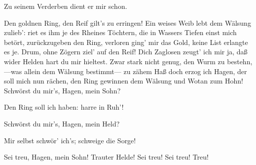 \begin{drama}
\Hagenspeaks



Zu seinem Verderben dient er mir schon.
 

\Alberichspeaks

Den goldnen Ring,
den Reif gilt's zu erringen!
Ein weises Weib lebt dem Wälsung zulieb':
riet es ihm je des Rheines Töchtern,
die in Wassers Tiefen einst mich betört,
zurückzugeben den Ring,
verloren ging' mir das Gold,
keine List erlangte es je.
Drum, ohne Zögern ziel' auf den Reif!
Dich Zaglosen zeugt' ich mir ja,
daß wider Helden hart du mir hieltest.
Zwar stark nicht genug, den Wurm zu bestehn,
---was allein dem Wälsung bestimmt---
zu zähem Haß doch erzog ich Hagen,
der soll mich nun rächen,
den Ring gewinnen
dem Wälsung und Wotan zum Hohn!
Schwörst du mir's, Hagen, mein Sohn?
 




\Hagenspeaks



Den Ring soll ich haben:
harre in Ruh'!
 

\Alberichspeaks

Schwörst du mir's, Hagen, mein Held?
 

\Hagenspeaks

Mir selbst schwör' ich's;
schweige die Sorge!
 

\Alberichspeaks



Sei treu, Hagen, mein Sohn!
Trauter Helde! Sei treu!
Sei treu! Treu!
 




\scene




\end{drama}
